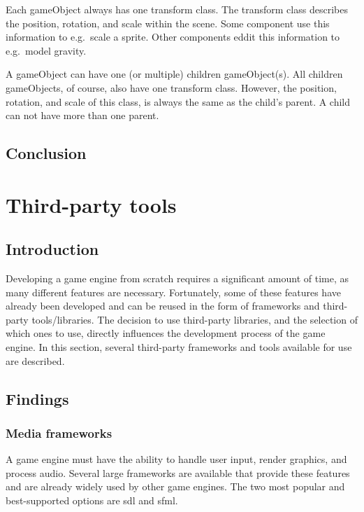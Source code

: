 \documentclass{projdoc}
\begin{document}
Each gameObject always has one transform class. The transform class describes the
position, rotation, and scale within the scene. Some component use this information
to e.g.~scale a sprite. Other components eddit this information to e.g.~model
gravity. \autocite{man:unityTransformClass}

A gameObject can have one (or multiple) children gameObject(s). All children
gameObjects, of course, also have one transform class. However, the position,
rotation, and scale of this class, is always the same as the child's parent. A child
can not have more than one parent. \autocite{man:unityTransformClass}

\subsection{Conclusion}

\section{Third-party tools}

\subsection{Introduction}

Developing a game engine from scratch requires a significant amount of time, as many
different features are necessary. Fortunately, some of these features have already
been developed and can be reused in the form of frameworks and third-party
tools/libraries. The decision to use third-party libraries, and the selection of
which ones to use, directly influences the development process of the game engine. In
this section, several third-party frameworks and tools available for use are
described.

\subsection{Findings}

\subsubsection{Media frameworks}

A game engine must have the ability to handle user input, render graphics, and
process audio. Several large frameworks are available that provide these features and
are already widely used by other game engines. The two most popular and
best-supported options are \gls{sdl} and \gls{sfml}.
\end{document}

